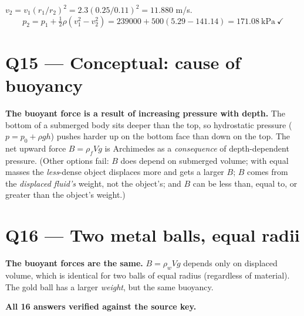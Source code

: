 \documentclass[11pt]{article}
\newcommand{\checkmk}{\ensuremath{\checkmark}}
\begin{document}
$v_2 = v_1(r_1/r_2)^2 = 2.3(0.25/0.11)^2 = 11.880$ m/s.
\[ p_2 = p_1 + \tfrac12\rho(v_1^2 - v_2^2) = 239000 + 500(5.29 - 141.14) = \boxed{171.08\ \text{kPa}}\ \checkmk \]

\section*{Q15 --- Conceptual: cause of buoyancy}
\textbf{The buoyant force is a result of increasing pressure with depth.} The bottom of a submerged body sits deeper than the top, so hydrostatic pressure ($p = p_0 + \rho g h$) pushes harder up on the bottom face than down on the top. The net upward force $B = \rho_f V g$ is Archimedes as a \emph{consequence} of depth-dependent pressure. (Other options fail: $B$ does depend on submerged volume; with equal masses the \emph{less}-dense object displaces more and gets a larger $B$; $B$ comes from the \emph{displaced fluid's} weight, not the object's; and $B$ can be less than, equal to, or greater than the object's weight.)

\section*{Q16 --- Two metal balls, equal radii}
\textbf{The buoyant forces are the same.} $B = \rho_w V g$ depends only on displaced volume, which is identical for two balls of equal radius (regardless of material). The gold ball has a larger \emph{weight}, but the same buoyancy.

\bigskip\noindent\textbf{All 16 answers verified against the source key.}
\end{document}
